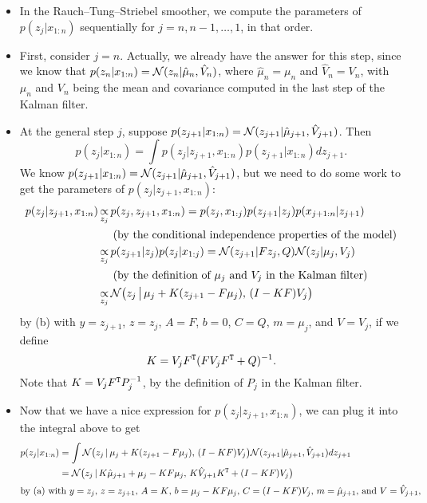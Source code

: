 \documentclass[12pt]{article}
\begin{document}
\begin{itemize}
\item In the Rauch--Tung--Striebel smoother, we compute the parameters of $p(z_j | x_{1:n})$ sequentially for $j = n,n-1,\ldots,1$, in that order.
\item First, consider $j = n$. Actually, we already have the answer for this step, since we know that $p(z_n | x_{1:n}) = \mathcal{N}(z_n | \hat\mu_n,\hat V_n)$, where $\hat \mu_n = \mu_n$ and $\hat V_n = V_n$, with $\mu_n$ and $V_n$ being the mean and covariance computed in the last step of the Kalman filter.
\item At the general step $j$, suppose $p(z_{j +1} | x_{1:n}) = \mathcal{N}(z_{j +1} | \hat\mu_{j +1},\hat V_{j +1})$. Then
$$ p(z_j | x_{1:n}) = \int p(z_j|z_{j +1},x_{1:n}) p(z_{j +1} | x_{1:n}) d z_{j +1}. $$
We know $p(z_{j+1}| x_{1:n}) = \mathcal{N}(z_{j +1} | \hat\mu_{j +1},\hat V_{j +1})$, but we need to do some work to get the parameters of $p(z_j | z_{j+1},x_{1:n})$:
\begin{align*}
p(z_j | z_{j+1},x_{1:n}) & \mathop{\propto}_{z_j} p(z_j,z_{j+1},x_{1:n}) = p(z_j , x_{1:j}) p(z_{j+1} | z_j) p(x_{j+1:n} | z_{j+1})\\
&~~~~\text{(by the conditional independence properties of the model)}\\
& \mathop{\propto}_{z_j} p(z_{j+1} | z_j) p(z_j | x_{1:j})
= \mathcal{N}(z_{j+1} | F z_j,Q) \mathcal{N}(z_j | \mu_j,V_j)\\
&~~~~\text{(by the definition of $\mu_j$ and $V_j$ in the Kalman filter)}\\
&\mathop{\propto}_{z_j} \mathcal{N} \big(z_j \,\big \vert\, \mu_j + K(z_{j+1} - F \mu_j),\, (I - K F) V_j \big)
\end{align*}
by (b) with $y = z_{j+1}$, $z = z_j$, $A = F$, $b = 0$, $C = Q$, $m = \mu_j$, and $V = V_j$, if we define
$$ K = V_j F^{\mathtt{T}}(F V_j F^{\mathtt{T}} + Q)^{-1}. $$
Note that $K = V_j F^{\mathtt{T}} P_j^{-1}$, by the definition of $P_j$ in the Kalman filter. 
\item Now that we have a nice expression for $p(z_j | z_{j+1},x_{1:n})$, we can plug it into the integral above to get
\begin{align*}
p(z_j | x_{1:n}) & = \int
\N\big(z_j \,\vert\, \mu_j + K(z_{j+1} - F \mu_j), \,(I - K F) V_j \big) \N(z_{j+1} | \hat \mu_{j+1},\hat V_{j+1}) d z_{j+1}\\
& = \N \big(z_j \,\vert \,K \hat \mu_{j+1} + \mu_j - K F \mu_j,\, K \hat V_{j+1} K^\T + (I - K F) V_j \big)\\
\intertext{by (a) with $y = z_j$, $z = z_{j+1}$, $A = K$, $b = \mu_j - K F \mu_j$, $C =(I - K F) V_j$, $m = \hat \mu_{j+1}$, and $V = \hat V_{j+1}$,}

\end{align*}
\end{itemize}
\end{document}
